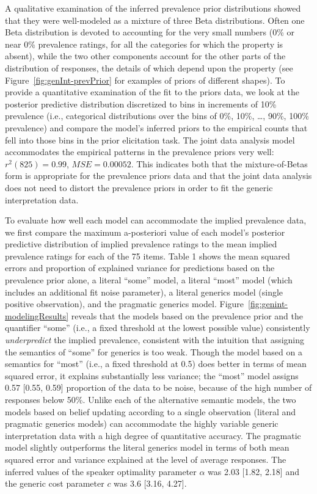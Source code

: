 \documentclass[floatsintext,doc]{apa6}
\begin{document}
A qualitative examination of the inferred prevalence prior distributions showed that they were well-modeled as a mixture of three Beta distributions.
Often one Beta distribution is devoted to accounting for the very small numbers (0\% or near 0\% prevalence ratings, for all the categories for which the property is absent), while the two other components account for the other parts of the distribution of responses, the details of which depend upon the property (see Figure~\ref{fig:genInt-prevPrior} for examples of priors of different shapes).
To provide a quantitative examination of the fit to the priors data, we look at the posterior predictive distribution discretized to bins in increments of 10\% prevalence (i.e., categorical distributions over the bins of 0\%, 10\%, \ldots{}, 90\%, 100\% prevalence) and compare the model's inferred priors to the empirical counts that fell into those bins in the prior elicitation task.
The joint data analysis model accommodates the empirical patterns in the prevalence priors very well: \(r^2(825) = 0.99\), \(MSE = 0.00052\).
This indicates both that the mixture-of-Betas form is appropriate for the prevalence priors data and that the joint data analysis does not need to distort the prevalence priors in order to fit the generic interpretation data.

To evaluate how well each model can accommodate the implied prevalence data, we first compare the maximum a-posteriori value of each model's posterior predictive distribution of implied prevalence ratings to the mean implied prevalence ratings for each of the 75 items.
Table 1 shows the mean squared errors and proportion of explained variance for predictions based on the prevalence prior alone, a literal \enquote{some} model, a literal \enquote{most} model (which includes an additional fit noise parameter), a literal generics model (single positive observation), and the pragmatic generics model.
Figure~\ref{fig:genint-modelingResults} reveals that the models based on the prevalence prior and the quantifier \enquote{some} (i.e., a fixed threshold at the lowest possible value) consistently \emph{underpredict} the implied prevalence, consistent with the intuition that assigning the semantics of \enquote{some} for generics is too weak.
Though the model based on a semantics for \enquote{most} (i.e., a fixed threshold at 0.5) does better in terms of mean squared error, it explains substantially less variance; the \enquote{most} model assigns 0.57 {[}0.55, 0.59{]} proportion of the data to be noise, because of the high number of responses below 50\%.
Unlike each of the alternative semantic models, the two models based on belief updating according to a single observation (literal and pragmatic generics models) can accommodate the highly variable generic interpretation data with a high degree of quantitative accuracy.
The pragmatic model slightly outperforms the literal generics model in terms of both mean squared error and variance explained at the level of average responses.
The inferred values of the speaker optimality parameter \(\alpha\) was 2.03 {[}1.82, 2.18{]} and the generic cost parameter \(c\) was 3.6 {[}3.16, 4.27{]}.
\end{document}
